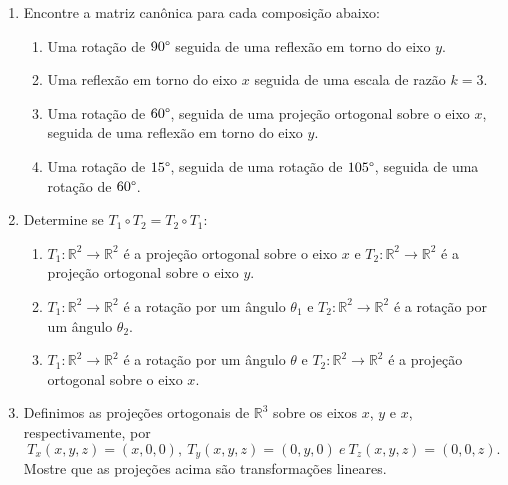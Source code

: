 \documentclass[a4paper,5pt]{amsbook}
\begin{document}
\vspace{1cm}
\begin{enumerate}
	\vspace{0.5cm}
	\item Encontre a matriz can\^onica para cada composi\c{c}\~ao abaixo:
		\begin{enumerate}
			\item Uma rota\c{c}\~ao de $90\degree$ seguida de uma reflex\~ao em torno
				do eixo $y$.
			\item Uma reflex\~ao em torno do eixo $x$ seguida de uma escala de
				raz\~ao $k=3$.
			\item Uma rota\c{c}\~ao de $60\degree$, seguida de uma proje\c{c}\~ao ortogonal
				sobre o eixo $x$, seguida de uma reflex\~ao em torno do eixo $y$.
			\item Uma rota\c{c}\~ao de $15\degree$, seguida de uma rota\c{c}\~ao de
				$105\degree$, seguida de uma rota\c{c}\~ao de $60\degree$.
		\end{enumerate}

	\vspace{0.5cm}
	\item Determine se $T_1\circ T_2 = T_2 \circ T_1$:
		\begin{enumerate}
			\item $T_1:\mathbb{R}^2 \rightarrow \mathbb{R}^2$ \'e a proje\c{c}\~ao
				ortogonal sobre o eixo $x$ e $T_2: \mathbb{R}^2 \rightarrow
				\mathbb{R}^2$ \'e a proje\c{c}\~ao ortogonal sobre o eixo $y$.
			\item $T_1:\mathbb{R}^2 \rightarrow \mathbb{R}^2$ \'e a rota\c{c}\~ao por
				um \^angulo $\theta_1$ e $T_2: \mathbb{R}^2 \rightarrow
				\mathbb{R}^2$ \'e a rota\c{c}\~ao por um \^angulo $\theta_2$.
			\item $T_1:\mathbb{R}^2 \rightarrow \mathbb{R}^2$ \'e a rota\c{c}\~ao por
				um \^angulo $\theta$ e $T_2: \mathbb{R}^2 \rightarrow
				\mathbb{R}^2$ \'e a proje\c{c}\~ao ortogonal sobre o eixo $x$.
		\end{enumerate}

	\vspace{0.5cm}
	\item Definimos as proje\c{c}\~oes ortogonais de $\mathbb{R}^3$ sobre os eixos
		$x$, $y$ e $x$, respectivamente, por
		\[T_x(x,y,z) = (x,0,0),\ T_y(x,y,z) = (0,y,0)\ e\ T_z(x,y,z) =
			(0,0,z).\]
	Mostre que as proje\c{c}\~oes acima s\~ao transforma\c{c}\~oes lineares.


\end{enumerate}
\end{document}
